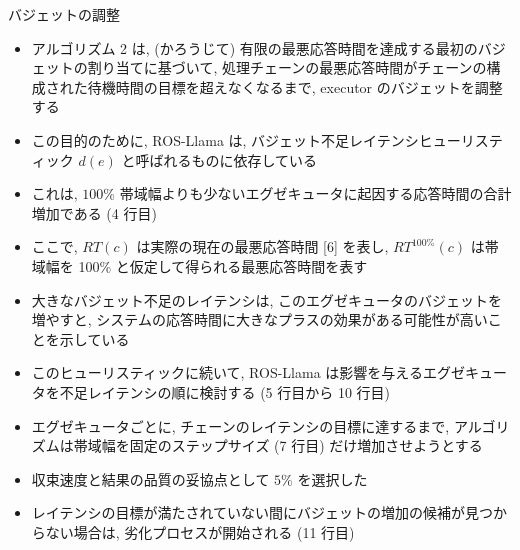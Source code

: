 \begin{frame}{バジェットの調整}
    \begin{itemize}
        \item アルゴリズム 2 は, (かろうじて) 有限の最悪応答時間を達成する最初のバジェットの割り当てに基づいて, 処理チェーンの最悪応答時間がチェーンの構成された待機時間の目標を超えなくなるまで, executor のバジェットを調整する
\item この目的のために, ROS-Llama は, バジェット不足レイテンシヒューリスティック $d(e)$ と呼ばれるものに依存している
\item これは, $100 \%$ 帯域幅よりも少ないエグゼキュータに起因する応答時間の合計増加である (4 行目)
\item ここで, $R T(c)$ は実際の現在の最悪応答時間 [6] を表し, $R T^{100 \%}(c)$ は帯域幅を 100\% と仮定して得られる最悪応答時間を表す
\item 大きなバジェット不足のレイテンシは, このエグゼキュータのバジェットを増やすと, システムの応答時間に大きなプラスの効果がある可能性が高いことを示している
    \end{itemize}
\end{frame}

\begin{frame}{}
    \begin{itemize}
        \item このヒューリスティックに続いて, ROS-Llama は影響を与えるエグゼキュータを不足レイテンシの順に検討する (5 行目から 10 行目)
\item エグゼキュータごとに, チェーンのレイテンシの目標に達するまで, アルゴリズムは帯域幅を固定のステップサイズ (7 行目) だけ増加させようとする
\item 収束速度と結果の品質の妥協点として $5 \%$ を選択した
\item レイテンシの目標が満たされていない間にバジェットの増加の候補が見つからない場合は, 劣化プロセスが開始される (11 行目)
    \end{itemize}
\end{frame}
